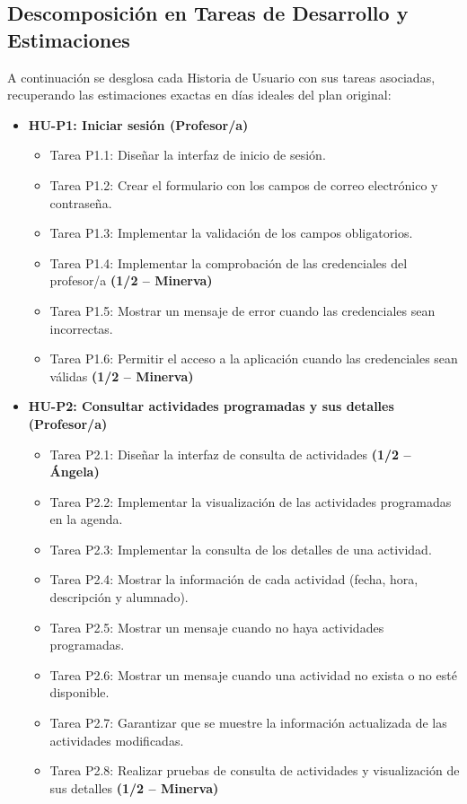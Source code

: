 \subsection{Descomposición en Tareas de Desarrollo y Estimaciones}
A continuación se desglosa cada Historia de Usuario con sus tareas asociadas, recuperando las estimaciones exactas en días ideales del plan original:

\begin{itemize}[leftmargin=1.2em, itemsep=4pt]
    \item \textbf{HU-P1: Iniciar sesión (Profesor/a)}
    \begin{itemize}[label=$\circ$, leftmargin=1.5em, itemsep=2pt]
        \item \textsf{Tarea P1.1:} Diseñar la interfaz de inicio de sesión.
        \item \textsf{Tarea P1.2:} Crear el formulario con los campos de correo electrónico y contraseña.
        \item \textsf{Tarea P1.3:} Implementar la validación de los campos obligatorios.
        \item \textsf{Tarea P1.4:} Implementar la comprobación de las credenciales del profesor/a \hfill \textbf{(1/2 -- Minerva)}
        \item \textsf{Tarea P1.5:} Mostrar un mensaje de error cuando las credenciales sean incorrectas.
        \item \textsf{Tarea P1.6:} Permitir el acceso a la aplicación cuando las credenciales sean válidas \hfill \textbf{(1/2 -- Minerva)}
    \end{itemize}

    \item \textbf{HU-P2: Consultar actividades programadas y sus detalles (Profesor/a)}
    \begin{itemize}[label=$\circ$, leftmargin=1.5em, itemsep=2pt]
        \item \textsf{Tarea P2.1:} Diseñar la interfaz de consulta de actividades \hfill \textbf{(1/2 -- Ángela)}
        \item \textsf{Tarea P2.2:} Implementar la visualización de las actividades programadas en la agenda.
        \item \textsf{Tarea P2.3:} Implementar la consulta de los detalles de una actividad.
        \item \textsf{Tarea P2.4:} Mostrar la información de cada actividad (fecha, hora, descripción y alumnado).
        \item \textsf{Tarea P2.5:} Mostrar un mensaje cuando no haya actividades programadas.
        \item \textsf{Tarea P2.6:} Mostrar un mensaje cuando una actividad no exista o no esté disponible.
        \item \textsf{Tarea P2.7:} Garantizar que se muestre la información actualizada de las actividades modificadas.
        \item \textsf{Tarea P2.8:} Realizar pruebas de consulta de actividades y visualización de sus detalles \hfill \textbf{(1/2 -- Minerva)}
    \end{itemize}


\end{itemize}
